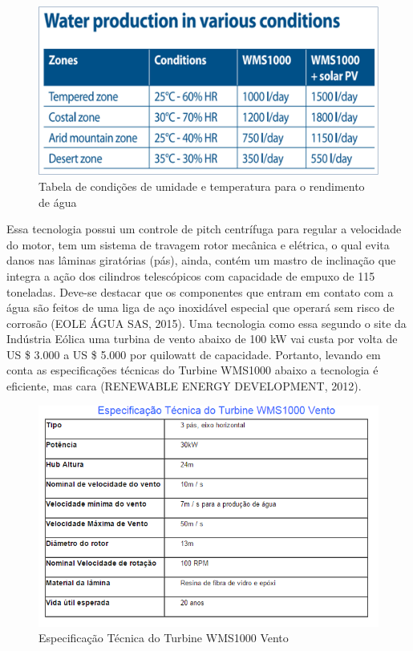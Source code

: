 \documentclass[12pt,openright,oneside,a4paper,brazil]{abntex2}
\begin{document}
\begin{figure}[!htbp]
\centering
\includegraphics[scale=0.3]{condicoes}
\caption[Caption title in LOF]{Tabela de condições de umidade e temperatura para o rendimento de água \footnotemark}
\FloatBarrier
\label{condicoes}
\end{figure}

Essa tecnologia possui um controle de pitch centrífuga para regular a velocidade do motor, tem um sistema de travagem rotor mecânica e elétrica, o qual evita danos nas lâminas giratórias (pás), ainda, contém um mastro de inclinação que integra a ação dos cilindros telescópicos com capacidade de empuxo de 115 toneladas. Deve-se destacar que os componentes que entram em contato com a água são feitos de uma liga de aço inoxidável especial que operará sem risco de corrosão (EOLE ÁGUA SAS, 2015).
	Uma tecnologia como essa segundo o site da Indústria Eólica uma turbina de vento abaixo de 100 kW vai custa por volta de US \$ 3.000 a US \$ 5.000  por quilowatt de capacidade. Portanto, levando em conta as especificações técnicas do Turbine WMS1000 abaixo a tecnologia é eficiente, mas cara (RENEWABLE ENERGY DEVELOPMENT, 2012).
	
\begin{figure}[!htbp]
\centering
\includegraphics[scale=0.8]{especificacao}
\caption[Caption title in LOF]{Especificação Técnica do Turbine WMS1000 Vento \footnotemark}
\FloatBarrier
\label{Especificacoes}
\end{figure}
 
\end{document}
